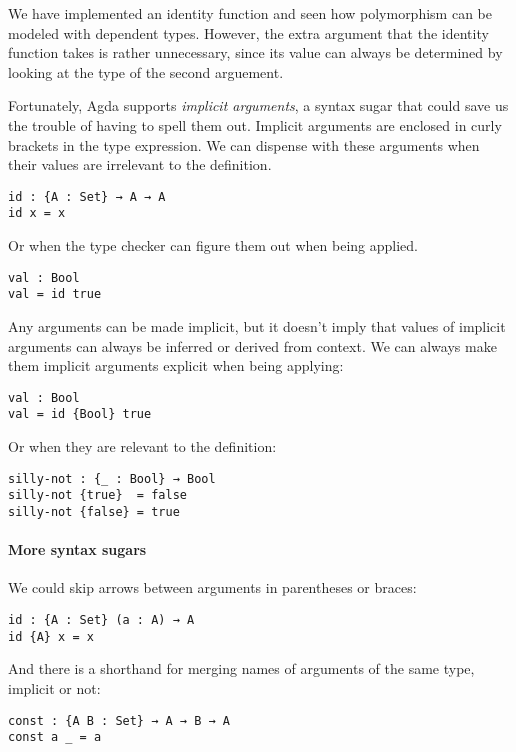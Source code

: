\documentclass[14pt, a4paper]{article}
\begin{document}
We have implemented an identity function and seen how polymorphism can be modeled
with dependent types. However, the extra argument that the identity function
takes is rather unnecessary, since its value can always be determined by looking
at the type of the second arguement.

Fortunately, Agda supports \textit{implicit arguments}, a syntax sugar that could
save us the trouble of having to spell them out. Implicit arguments are enclosed
in curly brackets in the type expression. We can dispense with these arguments
when their values are irrelevant to the definition.

\begin{lstlisting}
id : {A : Set} → A → A
id x = x
\end{lstlisting}

Or when the type checker can figure them out when being applied.

\begin{lstlisting}
val : Bool
val = id true
\end{lstlisting}

Any arguments can be made implicit, but it doesn't imply that values of
implicit arguments can always be inferred or derived from context. We can always
make them implicit arguments explicit when being applying:

\begin{lstlisting}
val : Bool
val = id {Bool} true
\end{lstlisting}

Or when they are relevant to the definition:

\begin{lstlisting}
silly-not : {_ : Bool} → Bool
silly-not {true}  = false
silly-not {false} = true
\end{lstlisting}

\paragraph{More syntax sugars}
We could skip arrows between arguments in parentheses or braces:

\begin{lstlisting}
id : {A : Set} (a : A) → A
id {A} x = x
\end{lstlisting}

And there is a shorthand for merging names of arguments of the same type, implicit or not:

\begin{lstlisting}
const : {A B : Set} → A → B → A
const a _ = a
\end{lstlisting}
\end{document}
